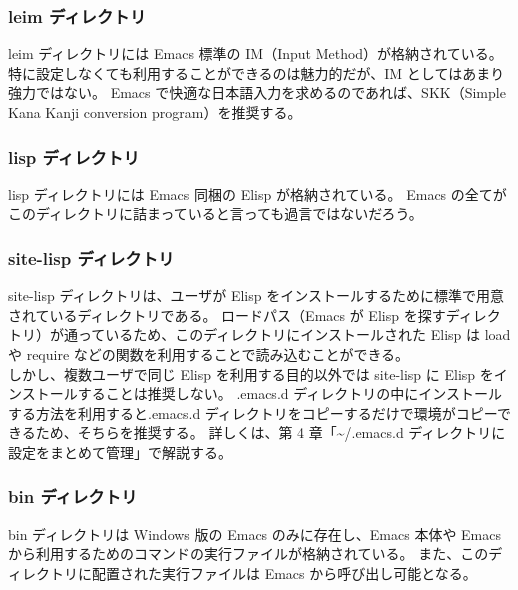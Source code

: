 \subsubsection{leim ディレクトリ}
leim ディレクトリには Emacs 標準の IM（Input Method）が格納されている。
特に設定しなくても利用することができるのは魅力的だが、IM としてはあまり強力ではない。
Emacs で快適な日本語入力を求めるのであれば、SKK（Simple Kana Kanji conversion program）を推奨する。
\subsubsection{lisp ディレクトリ}
lisp ディレクトリには Emacs 同梱の Elisp が格納されている。
Emacs の全てがこのディレクトリに詰まっていると言っても過言ではないだろう。
\subsubsection{site-lisp ディレクトリ}
site-lisp ディレクトリは、ユーザが Elisp をインストールするために標準で用意されているディレクトリである。
ロードパス（Emacs が Elisp を探すディレクトリ）が通っているため、このディレクトリにインストールされた Elisp は load や require などの関数を利用することで読み込むことができる。\\

しかし、複数ユーザで同じ Elisp を利用する目的以外では site-lisp に Elisp をインストールすることは推奨しない。
.emacs.d ディレクトリの中にインストールする方法を利用すると.emacs.d ディレクトリをコピーするだけで環境がコピーできるため、そちらを推奨する。
詳しくは、第 4 章「\textasciitilde{}/.emacs.d ディレクトリに設定をまとめて管理」で解説する。
\subsubsection{bin ディレクトリ}
bin ディレクトリは Windows 版の Emacs のみに存在し、Emacs 本体や Emacs から利用するためのコマンドの実行ファイルが格納されている。
また、このディレクトリに配置された実行ファイルは Emacs から呼び出し可能となる。
